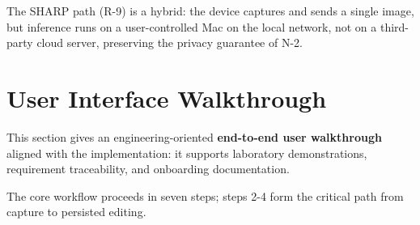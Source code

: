The SHARP path (R-9) is a hybrid: the device captures and sends a single image, but inference runs on a user-controlled Mac on the local network, not on a third-party cloud server, preserving the privacy guarantee of N-2.

\section{User Interface Walkthrough}

This section gives an engineering-oriented \textbf{end-to-end user walkthrough} aligned with the implementation: it supports laboratory demonstrations, requirement traceability, and onboarding documentation.

The core workflow proceeds in seven steps; steps 2-4 form the critical path from capture to persisted editing.

